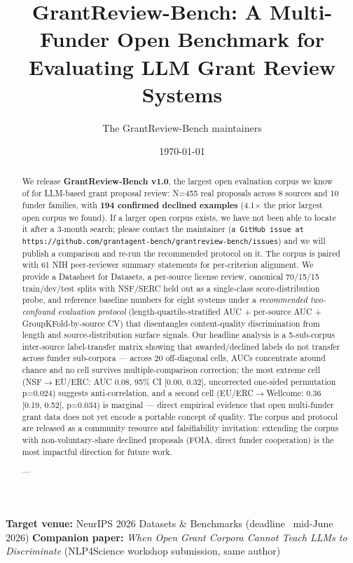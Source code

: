\documentclass[11pt]{article}
\title{GrantReview-Bench: A Multi-Funder Open Benchmark for Evaluating LLM Grant Review Systems}
\author{The GrantReview-Bench maintainers}
\date{\today}
\begin{document}
\maketitle


\textbf{Target venue:} NeurIPS 2026 Datasets \& Benchmarks (deadline ~mid-June 2026)
\textbf{Companion paper:} \emph{When Open Grant Corpora Cannot Teach LLMs to Discriminate} (NLP4Science workshop submission, same author)


\begin{abstract}
We release \textbf{GrantReview-Bench v1.0}, the largest open evaluation corpus we know of for LLM-based grant proposal review: N=455 real proposals across 8 sources and 10 funder families, with \textbf{194 confirmed declined examples} (4.1$\times$ the prior largest open corpus we found). If a larger open corpus exists, we have not been able to locate it after a 3-month search; please contact the maintainer (\texttt{a GitHub issue at https://github.com/grantagent-bench/grantreview-bench/issues}) and we will publish a comparison and re-run the recommended protocol on it. The corpus is paired with 61 NIH peer-reviewer summary statements for per-criterion alignment. We provide a Datasheet for Datasets, a per-source license review, canonical 70/15/15 train/dev/test splits with NSF/SERC held out as a single-class score-distribution probe, and reference baseline numbers for eight systems under a \emph{recommended two-confound evaluation protocol} (length-quartile-stratified AUC + per-source AUC + GroupKFold-by-source CV) that disentangles content-quality discrimination from length and source-distribution surface signals. Our headline analysis is a 5-sub-corpus inter-source label-transfer matrix showing that awarded/declined labels do not transfer across funder sub-corpora --- across 20 off-diagonal cells, AUCs concentrate around chance and no cell survives multiple-comparison correction; the most extreme cell (NSF$\rightarrow$EU/ERC: AUC 0.08, 95\% CI [0.00, 0.32], uncorrected one-sided permutation p=0.024) suggests anti-correlation, and a second cell (EU/ERC$\rightarrow$Wellcome: 0.36 [0.19, 0.52], p=0.034) is marginal --- direct empirical evidence that open multi-funder grant data does not yet encode a portable concept of quality. The corpus and protocol are released as a community resource and falsifiability invitation: extending the corpus with non-voluntary-share declined proposals (FOIA, direct funder cooperation) is the most impactful direction for future work.

---

\end{abstract}
\end{document}
